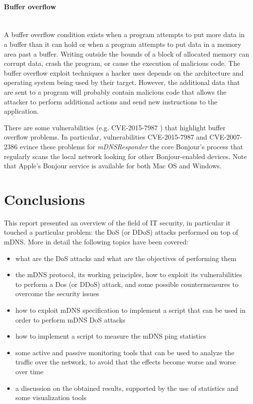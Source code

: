 \documentclass[fleqn, 11pt]{SelfArx} %
\begin{document}
\paragraph{Buffer overflow}\mbox{}\\
A buffer overflow condition exists when a program attempts to put more data in a buffer than it can hold or when a program attempts to put data in a memory area past a buffer. Writing outside the bounds of a block of allocated memory can corrupt data, crash the program, or cause the execution of malicious code. The buffer overflow exploit techniques a hacker uses depends on the architecture and operating system being used by their target. However, the additional data that are sent to a program will probably contain malicious code that allows the attacker to perform additional actions and send new instructions to the application. 

There are some vulnerabilities (e.g. CVE-2015-7987 \cite{CVE-2015-7987}) that highlight buffer overflow problems. In particular, vulnerabilities CVE-2015-7987 \cite{CVE-2015-7987} and CVE-2007-2386 \cite{CVE-2007-2386} evince these problems for
\textit{mDNSResponder} the core Bonjour's process that regularly scans the local network looking for other Bonjour-enabled devices. Note that Apple's Bonjour service is available for both Mac OS and Windows.  

\section{Conclusions}
This report presented an overview of the field of IT security, in particular it touched a particular problem: the DoS (or DDoS) attacks performed on top of mDNS. \newline
More in detail the following topics have been covered:
\begin{itemize}[leftmargin=*]
	\item what are the DoS attacks and what are the objectives of performing them 
	\item the mDNS protocol, its working principles, how to exploit its vulnerabilities to perform a Dos (or DDoS) attack, and some possible 
		  countermeasures to overcome the security issues
 	\item how to exploit mDNS specification to implement a script that can be used in order to perform mDNS DoS attacks
 	\item how to implement a script to measure the mDNS ping statistics
	\item some active and passive monitoring tools that can be used to analyze the traffic over the network,
	      to avoid that the effects become worse and worse over time
 	\item a discussion on the obtained results, supported by the use of statistics and some visualization tools
\end{itemize}
\end{document}
